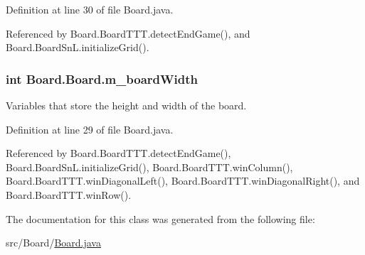 Definition at line 30 of file Board.\+java.



Referenced by Board.\+Board\+T\+T\+T.\+detect\+End\+Game(), and Board.\+Board\+Sn\+L.\+initialize\+Grid().

\hypertarget{class_board_1_1_board_a811ddc59658729b3cdb0a2db75465334}{}
\subsubsection[{m\+\_\+board\+Width}]{\setlength{\rightskip}{0pt plus 5cm}int Board.\+Board.\+m\+\_\+board\+Width\hspace{0.3cm}{\ttfamily [protected]}}\label{class_board_1_1_board_a811ddc59658729b3cdb0a2db75465334}
Variables that store the height and width of the board. 

Definition at line 29 of file Board.\+java.



Referenced by Board.\+Board\+T\+T\+T.\+detect\+End\+Game(), Board.\+Board\+Sn\+L.\+initialize\+Grid(), Board.\+Board\+T\+T\+T.\+win\+Column(), Board.\+Board\+T\+T\+T.\+win\+Diagonal\+Left(), Board.\+Board\+T\+T\+T.\+win\+Diagonal\+Right(), and Board.\+Board\+T\+T\+T.\+win\+Row().



The documentation for this class was generated from the following file\+:\begin{DoxyCompactItemize}
\item 
src/\+Board/\hyperlink{_board_8java}{Board.\+java}\end{DoxyCompactItemize}
